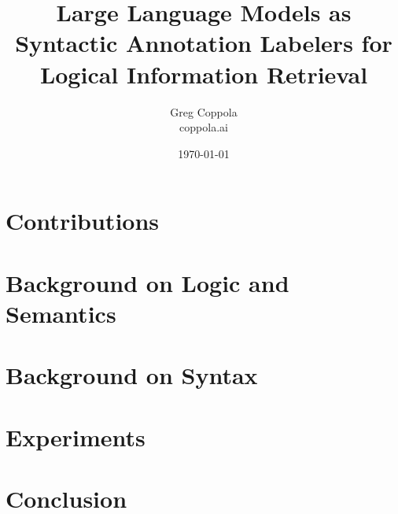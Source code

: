\documentclass[11pt]{article}
\title{Large Language Models as Syntactic Annotation Labelers for Logical Information Retrieval}
\author{Greg Coppola\\coppola.ai}
\date{\today}
\begin{document}
\maketitle



\section{Contributions}


\section{Background on Logic and Semantics}


\section{Background on Syntax}


\section{Experiments}


\section{Conclusion}




\end{document}
